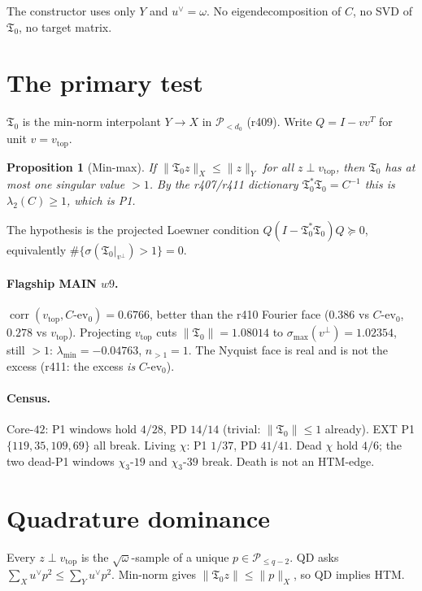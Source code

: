 \documentclass[11pt]{article}
\newtheorem{prop}{Proposition}
\theoremstyle{remark}
\newcommand{\Tfrak}{\mathfrak{T}}
\begin{document}
The constructor uses only $Y$ and $u^\vee=\omega$.
No eigendecomposition of $C$, no SVD of $\Tfrak_0$,
no target matrix.

\section{The primary test}

$\Tfrak_0$ is the min-norm interpolant $Y\to X$ in
$\mathcal{P}_{<d_0}$ (r409).
Write $Q=I-vv^T$ for unit $v=v_{\mathrm{top}}$.

\begin{prop}[Min-max]\label{prop:minmax}
If $\|\Tfrak_0 z\|_X\le\|z\|_Y$ for all $z\perp v_{\mathrm{top}}$,
then $\Tfrak_0$ has at most one singular value $>1$.
By the r407/r411 dictionary $\Tfrak_0^*\Tfrak_0=C^{-1}$
this is $\lambda_2(C)\ge 1$, which is P1.
\end{prop}

The hypothesis is the projected Loewner condition
$Q(I-\Tfrak_0^*\Tfrak_0)Q\succeq 0$, equivalently
$\#\{\sigma(\Tfrak_0|_{v^\perp})>1\}=0$.

\paragraph{Flagship MAIN $w9$.}
$\operatorname{corr}(v_{\mathrm{top}},C\text{-ev}_0)=0.6766$,
better than the r410 Fourier face ($0.386$ vs $C$-ev$_0$,
$0.278$ vs $v_{\mathrm{top}}$).
Projecting $v_{\mathrm{top}}$ cuts
$\|\Tfrak_0\|=1.08014$ to $\sigma_{\max}(v^\perp)=1.02354$,
still $>1$: $\lambda_{\min}=-0.04763$, $n_{>1}=1$.
The Nyquist face is real and is not the excess
(r411: the excess \emph{is} $C$-ev$_0$).

\paragraph{Census.}
Core-$42$: P1 windows hold $4/28$, PD $14/14$ (trivial:
$\|\Tfrak_0\|\le 1$ already).
EXT P1 $\{119,35,109,69\}$ all break.
Living $\chi$: P1 $1/37$, PD $41/41$.
Dead $\chi$ hold $4/6$; the two dead-P1 windows
$\chi_3$-$19$ and $\chi_3$-$39$ break.
Death is not an HTM-edge.

\section{Quadrature dominance}

Every $z\perp v_{\mathrm{top}}$ is the $\sqrt{\omega}$-sample
of a unique $p\in\mathcal{P}_{\le q-2}$.
QD asks $\sum_X u^\vee p^2\le\sum_Y u^\vee p^2$.
Min-norm gives $\|\Tfrak_0 z\|\le\|p\|_X$, so QD implies HTM.
\end{document}
